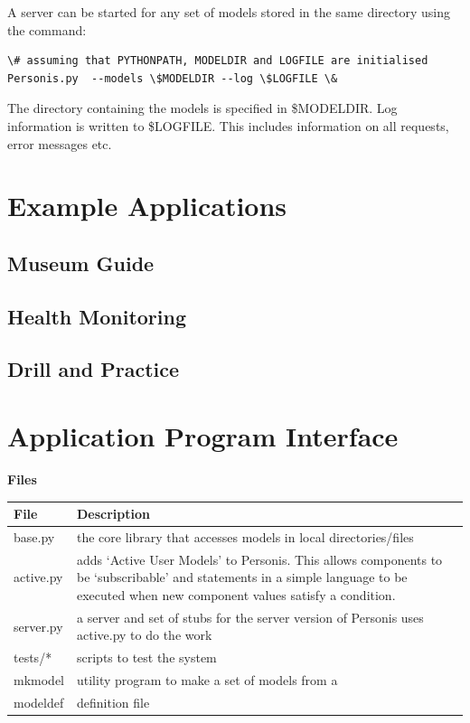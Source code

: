 \documentclass[letterpaper,10pt,english]{sphinxmanual}
\begin{document}
A server can be started for any set of models stored in the same directory using the command:

\begin{Verbatim}[commandchars=\\\{\}]
\# assuming that PYTHONPATH, MODELDIR and LOGFILE are initialised
Personis.py  --models \$MODELDIR --log \$LOGFILE \&
\end{Verbatim}

The directory containing the models is specified in \$MODELDIR.
Log information is written to \$LOGFILE. This includes information on all requests, error messages etc.


\chapter{Example Applications}
\label{Examples::doc}\label{Examples:example-applications}

\section{Museum Guide}
\label{Examples:museum-guide}

\section{Health Monitoring}
\label{Examples:health-monitoring}

\section{Drill and Practice}
\label{Examples:drill-and-practice}

\chapter{Application Program Interface}
\label{API:application-program-interface}\label{API::doc}
\textbf{Files}

\begin{tabulary}{\linewidth}{|L|L|}
\hline
\textbf{
File
} & \textbf{
Description
}\\\hline

base.py
 & 
the core library that accesses models in local directories/files
\\\hline

active.py
 & 
adds `Active User Models' to Personis. This allows components to
be `subscribable' and statements in a simple language to be
executed when new component values satisfy a condition.
\\\hline

server.py
 & 
a server and set of stubs for the server version of Personis
uses active.py to do the work
\\\hline

tests/*
 & 
scripts to test the system
\\\hline

mkmodel
 & 
utility program to make a set of models from a
\\\hline

modeldef
 & 
definition file
\\\hline
\end{tabulary}
\end{document}

